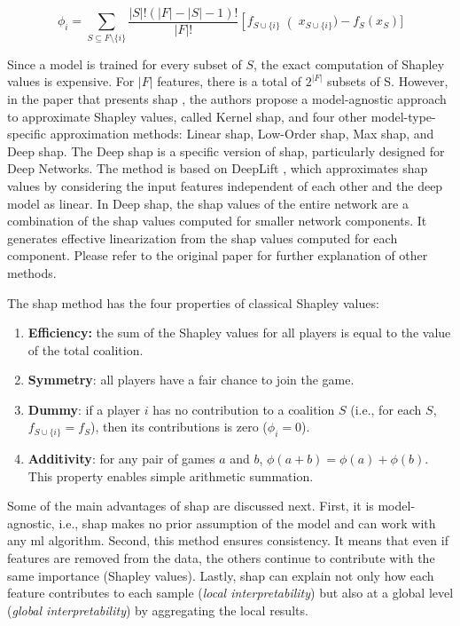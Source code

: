 \begin{equation}
\label{eq:shapley-values}
\phi_i = \sum_{S \subseteq F \setminus \{i\}} \frac{\left|S\right|!(\left|F\right| - \left|S\right| - 1)!}{\left|F\right|!}\left[f_{S \cup \{i\}}\right (x_{S \cup \{i\}}) - f_S(x_S)]
\end{equation}

Since a model is trained for every subset of $S$, the exact computation of Shapley values is expensive. For $\left|F\right|$ features, there is a total of $2^{\left|F\right|}$ subsets of S. However, in the paper that presents \acs{shap} \citep{shap2018}, the authors propose a model-agnostic approach to approximate Shapley values, called Kernel \acs{shap}, and four other model-type-specific approximation methods: Linear \acs{shap}, Low-Order \acs{shap}, Max \acs{shap}, and Deep \acs{shap}. The Deep \acs{shap} is a specific version of \acs{shap}, particularly designed for Deep Networks. The method is based on DeepLift \citep{deeplift_old, deeplift_new}, which approximates \acs{shap} values by considering the input features independent of each other and the deep model as linear. In Deep \acs{shap}, the \acs{shap} values of the entire network are a combination of the \acs{shap} values computed for smaller network components. It generates effective linearization from the \acs{shap} values computed for each component. Please refer to the original paper for further explanation of other methods.

The \acs{shap} method has the four properties of classical Shapley values:

\begin{enumerate}
\item \textbf{Efficiency:} the sum of the Shapley values for all players is equal to the value of the total coalition. 
\item \textbf{Symmetry}: all players have a fair chance to join the game.
\item \textbf{Dummy}: if a player $i$ has no contribution to a coalition $S$ (i.e., for each $S$, $f_{S \cup \{i\}} = f_S$), then its contributions is zero ($\phi_i = 0$).
\item \textbf{Additivity}: for any pair of games $a$ and $b$, $\phi(a + b) = \phi(a) + \phi(b)$. This property enables simple arithmetic summation.
\end{enumerate}

Some of the main advantages of \acs{shap} are discussed next. First, it is model-agnostic, i.e., \acs{shap} makes no prior assumption of the model and can work with any \acs{ml} algorithm. Second, this method ensures consistency. It means that even if features are removed from the data, the others continue to contribute with the same importance (Shapley values). Lastly, \acs{shap} can explain not only how each feature contributes to each sample (\textit{local interpretability}) but also at a global level (\textit{global interpretability}) by aggregating the local results.

